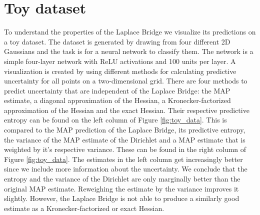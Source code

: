 \section{Toy dataset}
\label{subsec:exp4_toy_dataset}

To understand the properties of the Laplace Bridge we visualize its predictions on a toy dataset. The dataset is generated by drawing from four different 2D Gaussians and the task is for a neural network to classify them. The network is a simple four-layer network with ReLU activations and 100 units per layer. A visualization is created by using different methods for calculating predictive uncertainty for all points on a two-dimensional grid. There are four methods to predict uncertainty that are independent of the Laplace Bridge: the MAP estimate, a diagonal approximation of the Hessian, a Kronecker-factorized approximation of the Hessian and the exact Hessian. Their respective predictive entropy can be found on the left column of Figure \ref{fig:toy_data}. This is compared to the MAP prediction of the Laplace Bridge, its predictive entropy, the variance of the MAP estimate of the Dirichlet and a MAP estimate that is weighted by it's respective variance. These can be found in the right column of Figure \ref{fig:toy_data}. The estimates in the left column get increasingly better since we include more information about the uncertainty. We conclude that the entropy and the variance of the Dirichlet are only marginally better than the original MAP estimate. Reweighing the estimate by the variance improves it slightly. However, the Laplace Bridge is not able to produce a similarly good estimate as a Kronecker-factorized or exact Hessian. 



